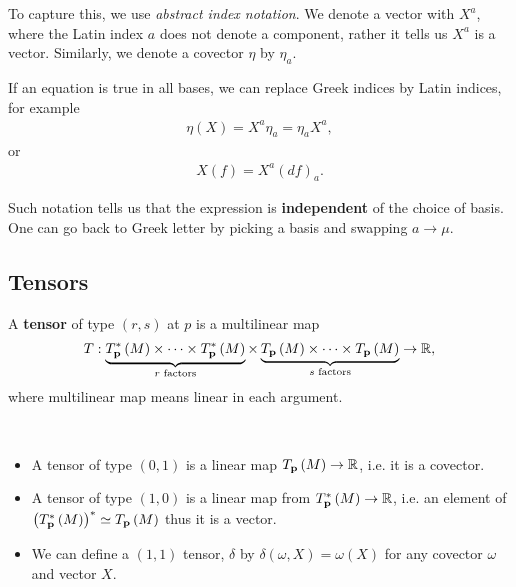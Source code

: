 To capture this, we use \textit{abstract index notation}. We denote a vector with $X^{a}$, where the Latin index $a$ does not denote a component, rather it tells us $X^{a}$ is a vector. Similarly, we denote a covector $\eta$ by $\eta_a$.

If an equation is true in all bases, we can replace Greek indices by Latin indices, for example
\begin{align}
    \eta \left( X \right) = X^{a} \eta_a = \eta_a X^{a}
,\end{align}
or
\begin{align}
    X \left( f \right) = X^{a} \left( d f \right)_a
.\end{align}

Such notation tells us that the expression is \textbf{independent} of the choice of basis. One can go back to Greek letter by picking a basis and swapping $a \to \mu$.

\subsection{Tensors}

\begin{definition}
    A \textbf{tensor} of type $\left( r,s \right) $ at $p$ is a multilinear map
    \begin{align}
        T : \underbrace{T^{*}_{\vb{p}}\left( M \right)  \times  \cdots \times  T^{*}_{\vb{p}} \left( M \right) }_{r\text{~factors}} \times \underbrace{T_{\vb{p}}\left( M \right) \times  \cdots \times T_{\vb{p}}\left( M \right) }_{s \text{~factors}} \to \mathbb{R}
    ,\end{align}
    where multilinear map means linear in each argument.
\end{definition}

\begin{examples}~
    \begin{itemize}
        \item A tensor of type $\left( 0,1 \right) $ is a linear map $T_{\vb{p}}\left( M \right) \to \mathbb{R}$, i.e. it is a covector.
        \item A tensor of type $\left( 1,0 \right) $ is a linear map from $T^{*}_{\vb{p}}\left( M \right) \to \mathbb{R}$, i.e. an element of $\left( T^{*}_{\vb{p}}\left( M \right)  \right)^{*} \simeq T_{\vb{p}}\left( M \right) $ thus it is a vector.
        \item We can define a $\left( 1,1 \right) $ tensor, $\delta$ by $\delta \left( \omega, X \right) = \omega \left( X \right) $ for any covector $\omega$ and vector $X$. 
    \end{itemize}
\end{examples}

